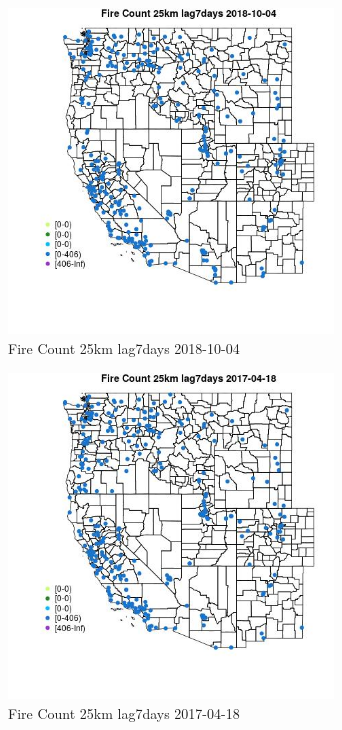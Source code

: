 \begin{figure} 
\centering  
\includegraphics[width=0.77\textwidth]{Code_Outputs/Report_ML_input_PM25_Step4_part_f_de_duplicated_aves_prioritize_24hr_obswNAs_MapObsFire_Count_25km_lag7days2018-10-04.jpg} 
\caption{\label{fig:Report_ML_input_PM25_Step4_part_f_de_duplicated_aves_prioritize_24hr_obswNAsMapObsFire_Count_25km_lag7days2018-10-04}Fire Count 25km lag7days 2018-10-04} 
\end{figure} 
 

\clearpage 

\begin{figure} 
\centering  
\includegraphics[width=0.77\textwidth]{Code_Outputs/Report_ML_input_PM25_Step4_part_f_de_duplicated_aves_prioritize_24hr_obswNAs_MapObsFire_Count_25km_lag7days2017-04-18.jpg} 
\caption{\label{fig:Report_ML_input_PM25_Step4_part_f_de_duplicated_aves_prioritize_24hr_obswNAsMapObsFire_Count_25km_lag7days2017-04-18}Fire Count 25km lag7days 2017-04-18} 
\end{figure} 
 

